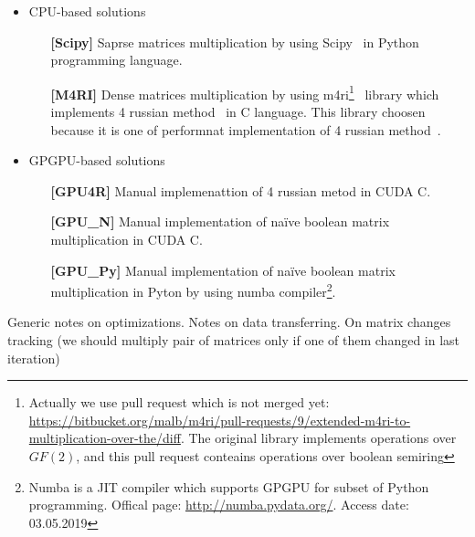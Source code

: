 \begin{itemize}
  \item CPU-based solutions 
  \begin{itemize}
    \item[\textbf{[Scipy]}] Saprse matrices multiplication by using Scipy~\cite{scipy} in Python programming language.
    \item[\textbf{[M4RI]}] Dense matrices multiplication by using m4ri\footnote{Actually we use pull request which is not merged yet: \url{https://bitbucket.org/malb/m4ri/pull-requests/9/extended-m4ri-to-multiplication-over-the/diff}. The original library implements operations over $GF(2)$, and this pull request conteains operations over boolean semiring}~\cite{M4RI} library which implements 4 russian method~\cite{arlazarov1970economical} in C language.
    This library choosen because it is one of performnat implementation of 4 russian method~\cite{albrechtefficient}.
  \end{itemize}
  \item GPGPU-based solutions
  \begin{itemize}
    \item[\textbf{[GPU4R]}] Manual implemenattion of 4 russian metod in CUDA C.
    \item[\textbf{[GPU\_N]}] Manual implementation of na\"ive boolean matrix multiplication in CUDA C.
    \item[\textbf{[GPU\_Py]}] Manual implementation of na\"ive boolean matrix multiplication in Pyton by using numba compiler\footnote{Numba is a JIT compiler which supports GPGPU for subset of Python programming. Offical page: \url{http://numba.pydata.org/}. Access date: 03.05.2019}. 
  \end{itemize}
\end{itemize}


Generic notes on optimizations.
Notes on data transferring.
On matrix changes tracking (we should multiply pair of matrices only if one of them changed in last iteration)
